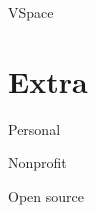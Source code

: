 

    {VSpace}

\section{Extra}


\cvline
    {Personal}
    {}
    {}{}{}
    {}

\cvline
    {Nonprofit}
    {}
    {}{}{}
    {}

\cvline
    {Open source}
    {}
    {}{}{}
    {}

